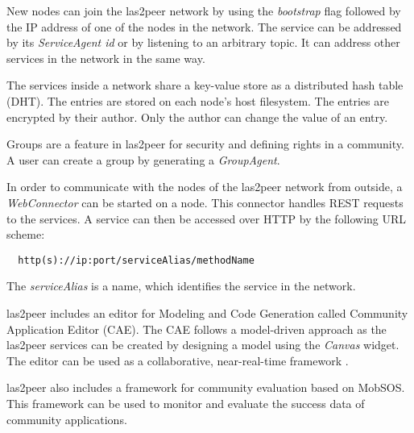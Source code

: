 New nodes can join the las2peer network by using the \emph{bootstrap} flag followed by the IP address of one of the nodes in the network. The service can be addressed by its \emph{ServiceAgent id}  or by listening to an arbitrary topic. It can address other services in the network in the same way. 

The services inside a network share a key-value store as a distributed hash table (DHT). The entries are stored on each node's host filesystem. The entries are encrypted by their author. Only the author can change the value of an entry.


Groups are a feature in las2peer for security and defining rights in a community. 
A user can create a group by generating a \emph{GroupAgent}. 

In order to communicate with the nodes of the las2peer network from outside, a \emph{WebConnector} can be started on a node. This connector handles REST requests to the services. A service can then be accessed over HTTP by the following URL scheme: 
\begin{lstlisting}
  http(s)://ip:port/serviceAlias/methodName
\end{lstlisting}
The \emph{serviceAlias} is a name, which identifies the service in the network. 

las2peer includes an editor for Modeling and Code Generation called Community Application Editor (CAE). 
The CAE follows a model-driven approach as the  las2peer services can be created by designing a model using the \emph{Canvas} widget. The editor can be used as a collaborative, near-real-time framework \cite{dND*16}. 

las2peer also includes a framework for community evaluation based on MobSOS. This framework can be used to monitor and evaluate the success data of community applications.

